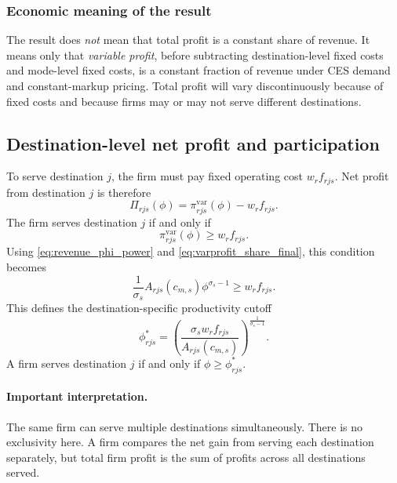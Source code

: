 \documentclass[11pt]{article}
\begin{document}
\subsubsection*{Economic meaning of the result}

The result does \emph{not} mean that total profit is a constant share of revenue. It means only that \emph{variable profit}, before subtracting destination-level fixed costs and mode-level fixed costs, is a constant fraction of revenue under CES demand and constant-markup pricing. Total profit will vary discontinuously because of fixed costs and because firms may or may not serve different destinations.

\subsection{Destination-level net profit and participation}

To serve destination \(j\), the firm must pay fixed operating cost \(w_r f_{rjs}\). Net profit from destination \(j\) is therefore
\begin{equation}
\Pi_{rjs}(\phi)=\pi^{\mathrm{var}}_{rjs}(\phi)-w_r f_{rjs}.
\end{equation}
The firm serves destination \(j\) if and only if
\begin{equation}
\pi^{\mathrm{var}}_{rjs}(\phi)\ge w_r f_{rjs}.
\label{eq:serve_destination_condition}
\end{equation}
Using \eqref{eq:revenue_phi_power} and \eqref{eq:varprofit_share_final}, this condition becomes
\begin{equation}
\frac{1}{\sigma_s}A_{rjs}(c_{m,s})\phi^{\sigma_s-1}\ge w_r f_{rjs}.
\end{equation}
This defines the destination-specific productivity cutoff
\begin{equation}
\phi^*_{rjs}=\left(\frac{\sigma_s w_r f_{rjs}}{A_{rjs}(c_{m,s})}\right)^{\frac{1}{\sigma_s-1}}.
\label{eq:destination_cutoff_final}
\end{equation}
A firm serves destination \(j\) if and only if \(\phi\ge \phi^*_{rjs}\).

\paragraph{Important interpretation.}
The same firm can serve multiple destinations simultaneously. There is no exclusivity here. A firm compares the net gain from serving each destination separately, but total firm profit is the sum of profits across all destinations served.
\end{document}
